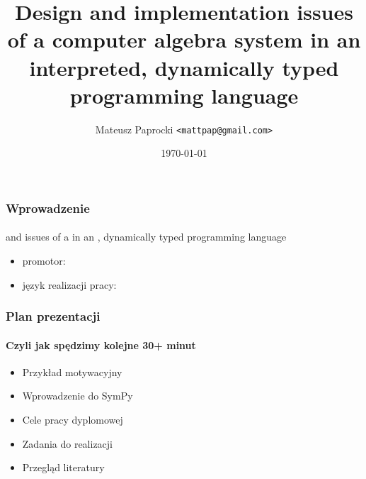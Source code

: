 \documentclass{beamer}
\title{
    Design and implementation issues \linebreak
    of a computer algebra system \linebreak
    in an interpreted, dynamically typed \linebreak
    programming language
}
\author{Mateusz Paprocki \texttt{<mattpap@gmail.com>}}
\institute[PWR]{Wrocław University of Technology}
\date{\today}
\begin{document}
\begin{frame}[plain,t]
    \maketitle
\end{frame}

\begin{frame}
    \frametitle{Wprowadzenie}
    \framesubtitle{}

    \begin{center}
         and  issues \linebreak
        of a  \linebreak
        in an , dynamically typed \linebreak
        programming language
    \end{center}

    \begin{itemize}
        \item promotor: 
        \item język realizacji pracy: 
    \end{itemize}
\end{frame}

\begin{frame}
    \frametitle{Plan prezentacji}
    \framesubtitle{Czyli jak spędzimy kolejne 30+ minut}

    \begin{itemize}
        \item Przykład motywacyjny
        \item Wprowadzenie do SymPy
        \item Cele pracy dyplomowej
        \item Zadania do realizacji
        \item Przegląd literatury
    \end{itemize}
\end{frame}
\end{document}
